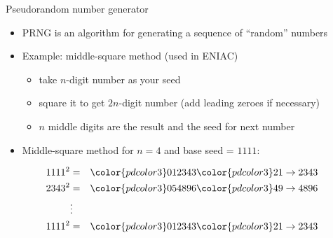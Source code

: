 \begin{slide}[toc=PRNG]{Pseudorandom number generator}
\null\vfill

  \begin{itemize}
    \item PRNG is an algorithm for generating a sequence of ``random'' numbers
    \item Example: middle-square method (used in ENIAC)
    \begin{itemize}
      \item take $n$-digit number as your seed
      \item square it to get $2n$-digit number (add leading zeroes if necessary)
      \item $n$ middle digits are the result and the seed for next number
    \end{itemize}
    \item Middle-square method for $n = 4$ and base seed = $1111$:
  \end{itemize}
  \vspace{-10pt}
  \begin{eqnarray*}
    1111^2 & = & {\color{pdcolor3}01}2343{\color{pdcolor3}21} \rightarrow 2343 \\
    2343^2 & = & {\color{pdcolor3}05}4896{\color{pdcolor3}49} \rightarrow 4896 \\
    & \vdots & \\
    1111^2 & = & {\color{pdcolor3}01}2343{\color{pdcolor3}21} \rightarrow 2343 
  \end{eqnarray*}
    
\vfill\null
\end{slide}

